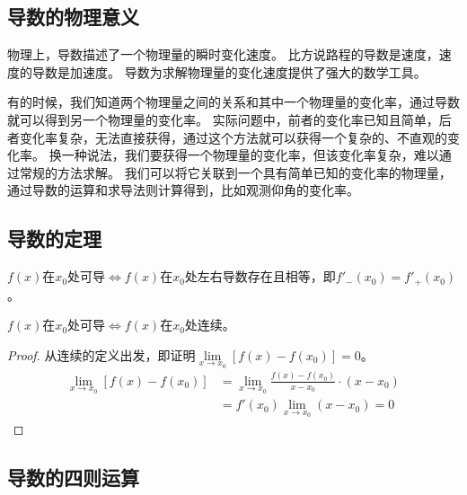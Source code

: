\subsection{导数的物理意义}

物理上，导数描述了一个物理量的瞬时变化速度。
比方说路程的导数是速度，速度的导数是加速度。
导数为求解物理量的变化速度提供了强大的数学工具。

有的时候，我们知道两个物理量之间的关系和其中一个物理量的变化率，通过导数就可以得到另一个物理量的变化率。
实际问题中，前者的变化率已知且简单，后者变化率复杂，无法直接获得，通过这个方法就可以获得一个复杂的、不直观的变化率。
换一种说法，我们要获得一个物理量的变化率，但该变化率复杂，难以通过常规的方法求解。
我们可以将它关联到一个具有简单已知的变化率的物理量，通过导数的运算和求导法则计算得到，比如观测仰角的变化率。

\subsection{导数的定理}

\begin{theorem}
$f\left( x \right) $在$x_0$处可导$\Leftrightarrow f\left( x \right) $在$x_0$处左右导数存在且相等，即$f'_-\left( x_0 \right) =f'_+\left( x_0 \right) $。
\end{theorem}

\begin{theorem}
$f\left( x \right) $在$x_0$处可导$\Leftrightarrow f\left( x \right) $在$x_0$处连续。
\end{theorem}

\begin{proof}
从连续的定义出发，即证明$\underset{x\rightarrow x_0}{\lim}\left[ f\left( x \right) -f\left( x_0 \right) \right] =0$。
\begin{align*}
\underset{x\rightarrow x_0}{\lim}\left[ f\left( x \right) -f\left( x_0 \right) \right] &=\underset{x\rightarrow x_0}{\lim}\frac{f\left( x \right) -f\left( x_0 \right)}{x-x_0}\cdot \left( x-x_0 \right) \\
&=f'\left( x_0 \right) \underset{x\rightarrow x_0}{\lim}\left( x-x_0 \right) =0
\end{align*}
\end{proof}

\subsection{导数的四则运算}

